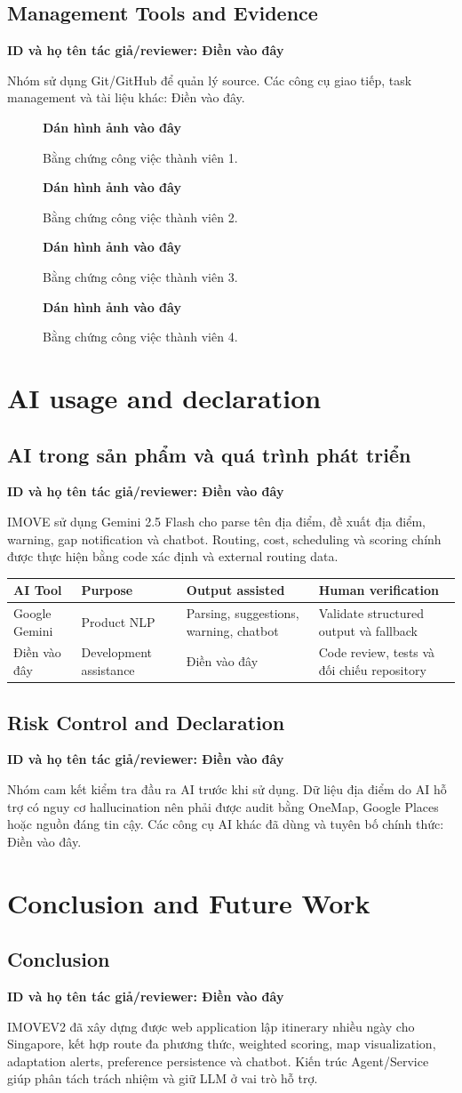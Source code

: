 \documentclass[12pt,a4paper,oneside]{report}
\newcommand{\tacgia}{%
  \begin{tcolorbox}[colback=blue!3,colframe=blue!25,boxrule=0.4pt,arc=1mm]
    \small\textbf{ID và họ tên tác giả/reviewer: Điền vào đây}
  \end{tcolorbox}
}
\newcommand{\danhinh}[1]{%
  \begin{figure}[H]
    \centering
    \begin{tcolorbox}[width=0.88\textwidth,height=5cm,valign=center,colback=gray!5,colframe=gray!45]
      \centering\Large\textbf{Dán hình ảnh vào đây}
    \end{tcolorbox}
    \caption{#1}
  \end{figure}
}
\begin{document}
\section{Management Tools and Evidence}
\tacgia
Nhóm sử dụng Git/GitHub để quản lý source. Các công cụ giao tiếp, task management và tài liệu khác: Điền vào đây.
\danhinh{Bằng chứng công việc thành viên 1.}
\danhinh{Bằng chứng công việc thành viên 2.}
\danhinh{Bằng chứng công việc thành viên 3.}
\danhinh{Bằng chứng công việc thành viên 4.}

\chapter{AI usage and declaration}
\section{AI trong sản phẩm và quá trình phát triển}
\tacgia
IMOVE sử dụng Gemini 2.5 Flash cho parse tên địa điểm, đề xuất địa điểm, warning, gap notification và chatbot. Routing, cost, scheduling và scoring chính được thực hiện bằng code xác định và external routing data.
\begin{longtable}{p{3.2cm}p{4cm}p{4.5cm}p{4cm}}
\toprule
\textbf{AI Tool} & \textbf{Purpose} & \textbf{Output assisted} & \textbf{Human verification} \\
\midrule
Google Gemini & Product NLP & Parsing, suggestions, warning, chatbot & Validate structured output và fallback \\
Điền vào đây & Development assistance & Điền vào đây & Code review, tests và đối chiếu repository \\
\bottomrule
\end{longtable}

\section{Risk Control and Declaration}
\tacgia
Nhóm cam kết kiểm tra đầu ra AI trước khi sử dụng. Dữ liệu địa điểm do AI hỗ trợ có nguy cơ hallucination nên phải được audit bằng OneMap, Google Places hoặc nguồn đáng tin cậy. Các công cụ AI khác đã dùng và tuyên bố chính thức: Điền vào đây.

\chapter{Conclusion and Future Work}
\section{Conclusion}
\tacgia
IMOVEV2 đã xây dựng được web application lập itinerary nhiều ngày cho Singapore, kết hợp route đa phương thức, weighted scoring, map visualization, adaptation alerts, preference persistence và chatbot. Kiến trúc Agent/Service giúp phân tách trách nhiệm và giữ LLM ở vai trò hỗ trợ.
\end{document}
